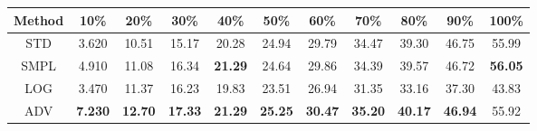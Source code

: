 \documentclass{standalone}
\begin{document}
\begin{tabular}{c|cccccccccc}
      \toprule
      Method & 10\% & 20\% & 30\% & 40\% & 50\% & 60\% & 70\% & 80\% & 90\% & 100\% \\
      \midrule
STD & 3.620 & 10.51 & 15.17 & 20.28 & 24.94 & 29.79 & 34.47 & 39.30 & 46.75 & 55.99\\
SMPL & 4.910 & 11.08 & 16.34 & \textbf{21.29} & 24.64 & 29.86 & 34.39 & 39.57 & 46.72 & \textbf{56.05}\\
LOG & 3.470 & 11.37 & 16.23 & 19.83 & 23.51 & 26.94 & 31.35 & 33.16 & 37.30 & 43.83\\
ADV & \textbf{7.230} & \textbf{12.70} & \textbf{17.33} & \textbf{21.29} & \textbf{25.25} & \textbf{30.47} & \textbf{35.20} & \textbf{40.17} & \textbf{46.94} & 55.92\\
  \bottomrule
\end{tabular}
\end{document}
